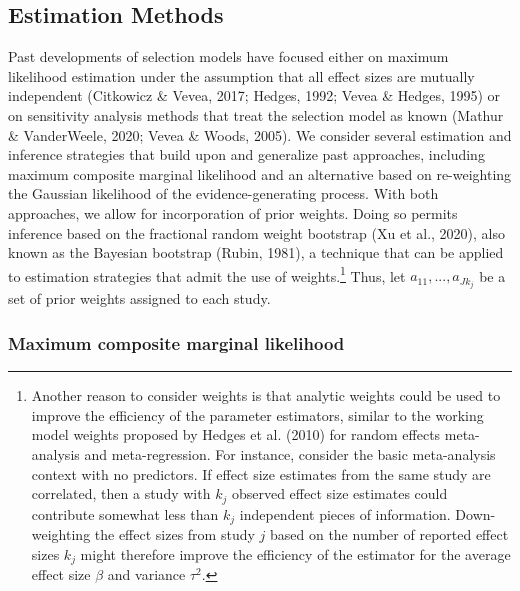 \documentclass[
  man, donotrepeattitle,floatsintext]{apa7}
\begin{document}
\subsection{Estimation Methods}\label{estimation-methods}

Past developments of selection models have focused either on maximum likelihood estimation under the assumption that all effect sizes are mutually independent (Citkowicz \& Vevea, 2017; Hedges, 1992; Vevea \& Hedges, 1995) or on sensitivity analysis methods that treat the selection model as known (Mathur \& VanderWeele, 2020; Vevea \& Woods, 2005). We consider several estimation and inference strategies that build upon and generalize past approaches, including maximum composite marginal likelihood and an alternative based on re-weighting the Gaussian likelihood of the evidence-generating process.
With both approaches, we allow for incorporation of prior weights.
Doing so permits inference based on the fractional random weight bootstrap (Xu et al., 2020), also known as the Bayesian bootstrap (Rubin, 1981), a technique that can be applied to estimation strategies that admit the use of weights.\footnote{Another reason to consider weights is that analytic weights could be used to improve the efficiency of the parameter estimators, similar to the working model weights proposed by Hedges et al. (2010) for random effects meta-analysis and meta-regression. For instance, consider the basic meta-analysis context with no predictors. If effect size estimates from the same study are correlated, then a study with \(k_j\) observed effect size estimates could contribute somewhat less than \(k_j\) independent pieces of information. Down-weighting the effect sizes from study \(j\) based on the number of reported effect sizes \(k_j\) might therefore improve the efficiency of the estimator for the average effect size \(\beta\) and variance \(\tau^2\).}
Thus, let \(a_{11},...,a_{J k_j}\) be a set of prior weights assigned to each study.

\subsubsection{Maximum composite marginal likelihood}\label{maximum-composite-marginal-likelihood}
\end{document}
